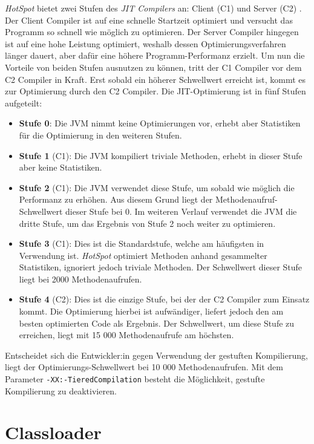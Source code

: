 \textit{HotSpot} bietet zwei Stufen des \textit{JIT Compilers} an: Client (C1) und Server (C2) \parencite{jvmhotspot}. Der Client Compiler ist auf eine schnelle Startzeit optimiert und versucht das Programm so schnell wie möglich zu optimieren. Der Server Compiler hingegen ist auf eine hohe Leistung optimiert, weshalb dessen Optimierungsverfahren länger dauert, aber dafür eine höhere Programm-Performanz erzielt. Um nun die Vorteile von beiden Stufen ausnutzen zu können, tritt der C1 Compiler vor dem C2 Compiler in Kraft. Erst sobald ein höherer Schwellwert erreicht ist, kommt es zur Optimierung durch den C2 Compiler. Die JIT-Optimierung ist in fünf Stufen aufgeteilt:
\begin{itemize}
    \item \textbf{Stufe 0}: Die JVM nimmt keine Optimierungen vor, erhebt aber Statistiken für die Optimierung in den weiteren Stufen.
    \item \textbf{Stufe 1} (C1): Die JVM kompiliert triviale Methoden, erhebt in dieser Stufe aber keine Statistiken.
    \item \textbf{Stufe 2} (C1): Die JVM verwendet diese Stufe, um sobald wie möglich die Performanz zu erhöhen. Aus diesem Grund liegt der Methodenaufruf-Schwellwert dieser Stufe bei 0. Im weiteren Verlauf verwendet die JVM die dritte Stufe, um das Ergebnis von Stufe 2 noch weiter zu optimieren.
    \item \textbf{Stufe 3} (C1): Dies ist die Standardstufe, welche am häufigsten in Verwendung ist. \textit{HotSpot} optimiert Methoden anhand gesammelter Statistiken, ignoriert jedoch triviale Methoden. Der Schwellwert dieser Stufe liegt bei 2000 Methodenaufrufen.
    \item \textbf{Stufe 4} (C2): Dies ist die einzige Stufe, bei der der C2 Compiler zum Einsatz kommt. Die Optimierung hierbei ist aufwändiger, liefert jedoch den am besten optimierten Code als Ergebnis. Der Schwellwert, um diese Stufe zu erreichen, liegt mit 15 000 Methodenaufrufe am höchsten.
\end{itemize}

Entscheidet sich die Entwickler:in gegen Verwendung der gestuften Kompilierung, liegt der Optimierungs-Schwellwert bei 10 000 Methodenaufrufen. Mit dem Parameter \texttt{-XX:-TieredCompilation} besteht die Möglichkeit, gestufte Kompilierung zu deaktivieren.

\section{Classloader}

